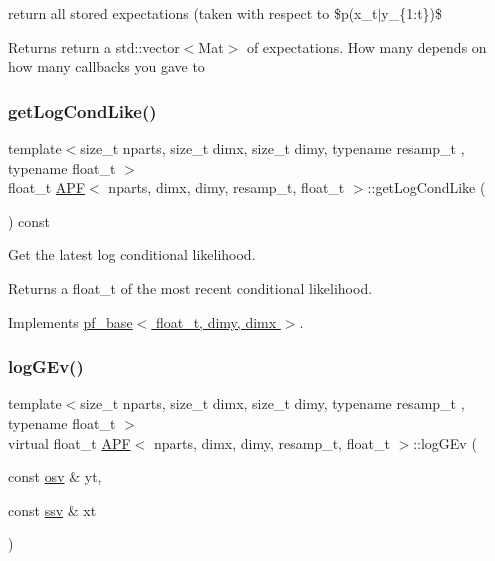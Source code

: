 return all stored expectations (taken with respect to \$p(x\+\_\+t$\vert$y\+\_\+\{1\+:t\})\$ 

\begin{DoxyReturn}{Returns}
return a std\+::vector$<$\+Mat$>$ of expectations. How many depends on how many callbacks you gave to 
\end{DoxyReturn}
\mbox{\label{classAPF_adc35c009dcf5b3289a4d46279527e024}} 
\subsubsection{\texorpdfstring{get\+Log\+Cond\+Like()}{getLogCondLike()}}
{\footnotesize\ttfamily template$<$size\+\_\+t nparts, size\+\_\+t dimx, size\+\_\+t dimy, typename resamp\+\_\+t , typename float\+\_\+t $>$ \\
float\+\_\+t \hyperlink{classAPF}{A\+PF}$<$ nparts, dimx, dimy, resamp\+\_\+t, float\+\_\+t $>$\+::get\+Log\+Cond\+Like (\begin{DoxyParamCaption}{ }\end{DoxyParamCaption}) const\hspace{0.3cm}{\ttfamily [virtual]}}



Get the latest log conditional likelihood. 

\begin{DoxyReturn}{Returns}
a float\+\_\+t of the most recent conditional likelihood. 
\end{DoxyReturn}


Implements \hyperlink{classpf__base_a350df818820d6ab0fd6d413022b7f23b}{pf\+\_\+base$<$ float\+\_\+t, dimy, dimx $>$}.

\mbox{\label{classAPF_ab81a714dacc1ee5ea1aa66ffee46f832}} 
\subsubsection{\texorpdfstring{log\+G\+Ev()}{logGEv()}}
{\footnotesize\ttfamily template$<$size\+\_\+t nparts, size\+\_\+t dimx, size\+\_\+t dimy, typename resamp\+\_\+t , typename float\+\_\+t $>$ \\
virtual float\+\_\+t \hyperlink{classAPF}{A\+PF}$<$ nparts, dimx, dimy, resamp\+\_\+t, float\+\_\+t $>$\+::log\+G\+Ev (\begin{DoxyParamCaption}\item[{const \hyperlink{classAPF_aa8ac25c475e54ddf21999f28727a049e}{osv} \&}]{yt,  }\item[{const \hyperlink{classAPF_a5f96da87f00ff75af1232f9021daf06a}{ssv} \&}]{xt }\end{DoxyParamCaption})\hspace{0.3cm}{\ttfamily [pure virtual]}}



